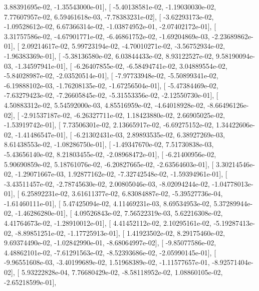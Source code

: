 \documentclass{article}
\begin{document}
          3.88391695e-02,  -1.35543000e-01],
       [ -5.40138581e-02,  -1.19030030e-02,   7.77607957e-02,
          6.59461618e-03,  -7.78383231e-02],
       [ -3.62293173e-02,  -1.09528612e-02,   6.67366314e-02,
         -1.03874952e-01,  -2.07402172e-01],
       [  3.31757586e-02,  -4.67901771e-02,  -6.46861752e-02,
         -1.69204869e-03,  -2.23689862e-01],
       [  2.09214617e-02,   5.99723194e-02,  -4.70010271e-02,
         -3.56752934e-02,  -1.96383369e-01],
       [ -5.38136580e-02,   6.03844433e-02,   8.93122527e-02,
          9.58190094e-03,  -1.34597941e-01],
       [ -6.26407855e-02,  -6.58494741e-02,   3.04889554e-02,
         -5.84028987e-02,  -2.03520514e-01],
       [ -7.97733948e-02,  -5.50899341e-02,  -6.19888102e-03,
         -1.76208135e-02,  -1.67256504e-01],
       [ -5.47384469e-02,  -7.63279423e-02,  -7.26605845e-02,
         -5.31553356e-02,  -2.12550730e-01],
       [  4.50883312e-02,   5.54592000e-03,   4.85516959e-02,
         -4.64018928e-02,  -8.66496126e-02],
       [ -2.91537187e-02,  -6.26327711e-02,   1.18423880e-02,
          2.66905025e-02,  -1.53919742e-01],
       [  7.73506301e-02,   2.13665917e-02,  -6.69275152e-02,
          1.34422606e-02,  -1.41486547e-01],
       [ -6.21302431e-03,   2.89893535e-02,   6.38927269e-03,
          8.61438553e-02,  -1.08286750e-01],
       [ -1.49347670e-02,   7.51730838e-03,  -5.43656140e-02,
          8.21803455e-02,  -2.08968472e-01],
       [ -6.21400956e-02,   5.90690859e-02,   5.18761076e-02,
         -6.20827665e-02,  -2.63564603e-01],
       [  3.30214546e-02,  -1.29071667e-03,   1.92877162e-02,
         -7.32742548e-02,  -1.59394961e-01],
       [ -3.43511457e-02,  -2.78745630e-02,   2.00805046e-03,
         -8.02094244e-02,  -1.04778013e-01],
       [  6.25892231e-02,   3.61611377e-02,   6.83084887e-02,
         -5.39527736e-04,  -1.61460111e-01],
       [  5.47425094e-02,   4.11469231e-03,   8.69534953e-02,
          5.37289944e-02,  -1.46286280e-01],
       [  4.09526843e-02,   7.56522319e-03,   5.62216308e-02,
          4.41764673e-02,  -1.28910012e-01],
       [  4.41452112e-02,   2.10295161e-02,  -5.19287413e-02,
         -8.89851251e-02,  -1.17725913e-01],
       [  1.41923502e-02,   8.29175460e-02,   9.69374490e-02,
         -1.02842990e-01,  -8.68064997e-02],
       [ -9.85077586e-02,   4.48862101e-02,  -7.61291563e-02,
         -8.52393686e-02,  -2.05990145e-01],
       [ -9.96551608e-03,  -3.40199689e-02,   1.51968389e-02,
         -1.11577657e-01,  -8.92571404e-02],
       [  5.93222828e-04,   7.76680429e-02,  -8.58118952e-02,
          1.08860105e-02,  -2.65218599e-01],
\end{document}

